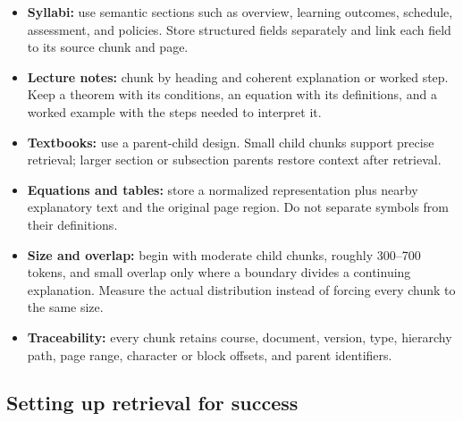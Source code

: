 \documentclass[11pt]{article}
\begin{document}
\begin{itemize}
    \item \textbf{Syllabi:} use semantic sections such as overview, learning outcomes, schedule, assessment, and policies. Store structured fields separately and link each field to its source chunk and page.
    \item \textbf{Lecture notes:} chunk by heading and coherent explanation or worked step. Keep a theorem with its conditions, an equation with its definitions, and a worked example with the steps needed to interpret it.
    \item \textbf{Textbooks:} use a parent-child design. Small child chunks support precise retrieval; larger section or subsection parents restore context after retrieval.
    \item \textbf{Equations and tables:} store a normalized representation plus nearby explanatory text and the original page region. Do not separate symbols from their definitions.
    \item \textbf{Size and overlap:} begin with moderate child chunks, roughly 300--700 tokens, and small overlap only where a boundary divides a continuing explanation. Measure the actual distribution instead of forcing every chunk to the same size.
    \item \textbf{Traceability:} every chunk retains course, document, version, type, hierarchy path, page range, character or block offsets, and parent identifiers.
\end{itemize}

\subsection{Setting up retrieval for success}
\end{document}
